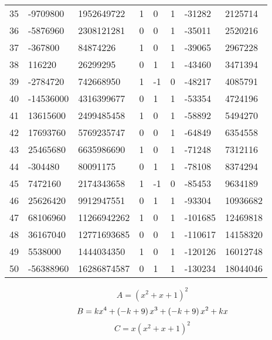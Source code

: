 \documentclass{amsart}
\begin{document}
\begin{longtable}{|l|l|l|lllll|}
35&-9709800&1952649722&1&0&1&-31282&2125714\\
36&-5876960&2308121281&0&0&1&-35011&2520216\\
37&-367800&84874226&1&0&1&-39065&2967228\\
38&116220&26299295&0&1&1&-43460&3471394\\
39&-2784720&742668950&1&-1&0&-48217&4085791\\
40&-14536000&4316399677&0&1&1&-53354&4724196\\
41&13615600&2499485458&1&0&1&-58892&5494270\\
42&17693760&5769235747&0&0&1&-64849&6354558\\
43&25465680&6635986690&1&0&1&-71248&7312116\\
44&-304480&80091175&0&1&1&-78108&8374294\\
45&7472160&2174343658&1&-1&0&-85453&9634189\\
46&25626420&9912947551&0&1&1&-93304&10936682\\
47&68106960&11266942262&1&0&1&-101685&12469818\\
48&36167040&12771693685&0&0&1&-110617&14158320\\
49&5538000&1444034350&1&0&1&-120126&16012748\\
50&-56388960&16286874587&0&1&1&-130234&18044046\\
\hline
\end{longtable}
$$A=(x^2
 + x
 + 1)^{2}$$
$$B=k\*x^4
 + \left(-k
 + 9\right) \*x^3
 + \left(-k
 + 9\right) \*x^2
 + k\*x$$
$$C=x(x^2
 + x
 + 1)^{2}$$
\end{document}
